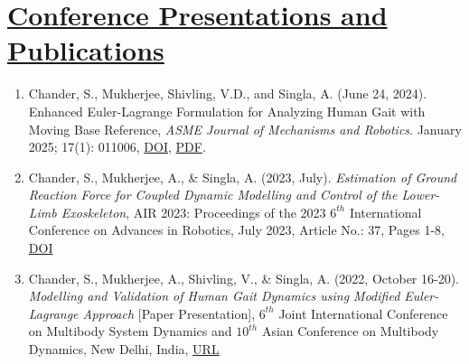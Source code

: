 \section{\underline{Conference Presentations and Publications}}
\begin{enumerate}
	\item Chander, S., Mukherjee, Shivling, V.D., and Singla, A. (June 24, 2024). Enhanced Euler-Lagrange Formulation for Analyzing Human Gait with Moving Base Reference, \emph{ASME Journal of Mechanisms and Robotics}. January 2025; 17(1): 011006, \href{https://doi.org/10.1115/1.4065520}{\large DOI}, \href{https://average-engineer.github.io/Projects-Website-Ashutosh-Mukherjee/Resources/JMR-24-1049.pdf}{\large PDF}.
	\item Chander, S., Mukherjee, A., \& Singla, A. (2023, July). \emph{Estimation of Ground Reaction Force for Coupled Dynamic Modelling and Control of the Lower-Limb Exoskeleton}, AIR 2023: Proceedings of the 2023 $6^{th}$ International Conference on Advances in Robotics, July 2023, Article No.: 37, Pages 1-8, \href{https://doi.org/10.1145/3610419.3610456  }{\large{DOI}}
	\item Chander, S., Mukherjee, A., Shivling, V., \& Singla, A. (2022, October 16-20). \emph{Modelling and Validation of Human Gait Dynamics using Modified Euler-Lagrange Approach} [Paper Presentation], $6^{th}$ Joint International Conference on Multibody System Dynamics and $10^{th}$ Asian Conference on Multibody Dynamics, New Delhi, India, \href{http://imsdacmd2020.iitd.ac.in/web-abstracts/pdf/WEB_ABSTRACTS/IMSDACMD2020_219.pdf}{\large{URL}}
\end{enumerate}
